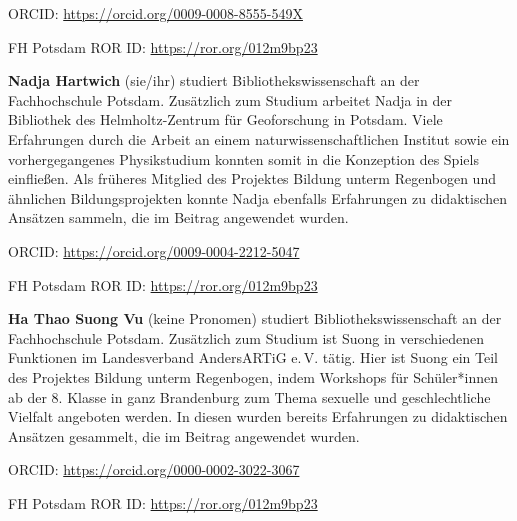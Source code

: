 \documentclass[a4paper,
fontsize=11pt,
oneside,
numbers=noperiodatend,
parskip=half-,
bibliography=totoc,
final
]{scrartcl}
\begin{document}
ORCID: \url{https://orcid.org/0009-0008-8555-549X}

FH Potsdam ROR ID: \url{https://ror.org/012m9bp23}

\textbf{Nadja Hartwich} (sie/ihr) studiert Bibliothekswissenschaft an
der Fachhochschule Potsdam. Zusätzlich zum Studium arbeitet Nadja in der
Bibliothek des Helmholtz-Zentrum für Geoforschung in Potsdam. Viele
Erfahrungen durch die Arbeit an einem naturwissenschaftlichen Institut
sowie ein vorhergegangenes Physikstudium konnten somit in die Konzeption
des Spiels einfließen. Als früheres Mitglied des Projektes Bildung
unterm Regenbogen und ähnlichen Bildungsprojekten konnte Nadja ebenfalls
Erfahrungen zu didaktischen Ansätzen sammeln, die im Beitrag angewendet
wurden.

ORCID: \url{https://orcid.org/0009-0004-2212-5047}

FH Potsdam ROR ID: \url{https://ror.org/012m9bp23}

\textbf{Ha Thao Suong Vu} (keine Pronomen) studiert
Bibliothekswissenschaft an der Fachhochschule Potsdam. Zusätzlich zum
Studium ist Suong in verschiedenen Funktionen im Landesverband
AndersARTiG e.\,V. tätig. Hier ist Suong ein Teil des Projektes Bildung
unterm Regenbogen, indem Workshops für Schüler*innen ab der 8. Klasse in
ganz Brandenburg zum Thema sexuelle und geschlechtliche Vielfalt
angeboten werden. In diesen wurden bereits Erfahrungen zu didaktischen
Ansätzen gesammelt, die im Beitrag angewendet wurden.

ORCID: \url{https://orcid.org/0000-0002-3022-3067}

FH Potsdam ROR ID: \url{https://ror.org/012m9bp23}
\end{document}
